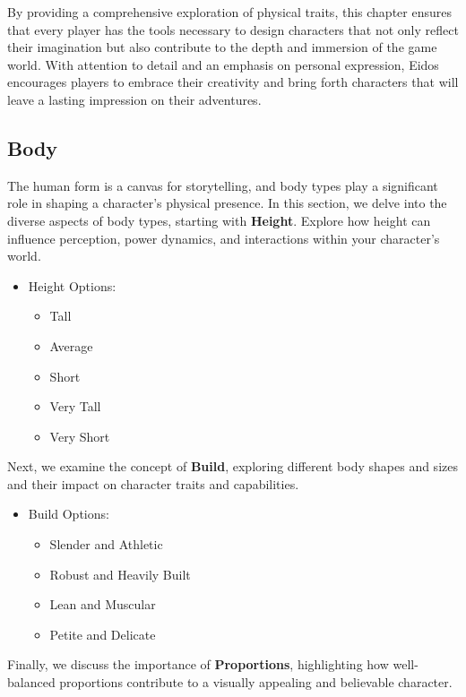 \documentclass[12pt]{book}
\begin{document}
By providing a comprehensive exploration of physical traits, this chapter ensures that every player has the tools necessary to design characters that not only reflect their imagination but also contribute to the depth and immersion of the game world. With attention to detail and an emphasis on personal expression, Eidos encourages players to embrace their creativity and bring forth characters that will leave a lasting impression on their adventures.

\subsection{\textbf{Body}}

The human form is a canvas for storytelling, and body types play a significant role in shaping a character's physical presence. In this section, we delve into the diverse aspects of body types, starting with \textbf{Height}. Explore how height can influence perception, power dynamics, and interactions within your character's world.

\begin{itemize}
    \item Height Options:
    \begin{itemize}
        \item Tall
        \item Average
        \item Short
        \item Very Tall
        \item Very Short
    \end{itemize}
\end{itemize}

Next, we examine the concept of \textbf{Build}, exploring different body shapes and sizes and their impact on character traits and capabilities.

\begin{itemize}
    \item Build Options:
    \begin{itemize}
        \item Slender and Athletic
        \item Robust and Heavily Built
        \item Lean and Muscular
        \item Petite and Delicate
    \end{itemize}
\end{itemize}

Finally, we discuss the importance of \textbf{Proportions}, highlighting how well-balanced proportions contribute to a visually appealing and believable character.
\end{document}
